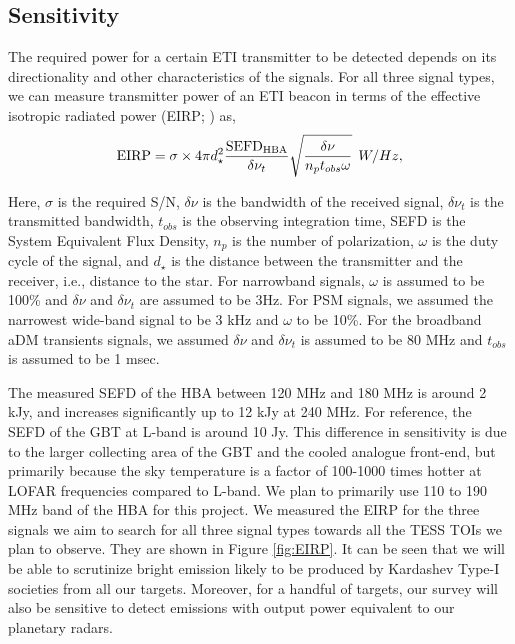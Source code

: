 \documentclass{aastex63}
\begin{document}
\subsection{Sensitivity}
\label{sect:sensitivity}
The required power for a certain ETI transmitter to be detected depends on its directionality and other characteristics of the signals. For all three signal types, we can measure transmitter power of an ETI beacon in terms of the effective isotropic radiated power (EIRP; \citealt{Enriquez:2017}) as, 
\begin{equation}
    {\rm EIRP} = \sigma \times {4 \pi d_\star^2} \frac{\rm SEFD_{\rm HBA}}{\delta{\nu}_{t}} \sqrt{\frac{\delta{\nu}}{n_{p}t_{obs}{\omega}}}  \>\> W/Hz,
    \label{Eq:EIRP}
\end{equation}

Here, $\sigma$ is the required S/N, $\delta{\nu}$ is the bandwidth of the received signal, $\delta{\nu}_{t}$ is the transmitted bandwidth, $t_{obs}$ is the observing integration time, SEFD is the System Equivalent Flux Density, $n_p$ is the number of polarization, $\omega$ is the duty cycle of the signal, and $d_\star$ is the distance between the transmitter and the receiver, i.e., distance to the star. For narrowband signals, $\omega$ is assumed to be 100\% and $\delta{\nu}$ and $\delta{\nu}_{t}$ are assumed to be 3Hz. For PSM signals, we assumed the narrowest wide-band signal to be 3 kHz and $\omega$ to be 10\%. For the broadband aDM transients signals, we assumed $\delta{\nu}$ and $\delta{\nu}_{t}$ is assumed to be 80 MHz and $t_{obs}$ is assumed to be 1 msec. 

The measured SEFD of the HBA between 120 MHz and 180 MHz is around 2 kJy, and increases significantly up to 12 kJy at 240 MHz. For reference, the SEFD of the GBT at L-band is around 10 Jy. This difference in sensitivity is due to the larger collecting area of the GBT and the cooled analogue front-end, but primarily because the sky temperature is a factor of 100-1000 times hotter at LOFAR frequencies compared to L-band. We plan to primarily use 110 to 190 MHz band of the HBA for this project. We measured the EIRP for the three signals we aim to search for all three signal types towards all the TESS TOIs we plan to observe. They are shown in Figure \ref{fig:EIRP}. It can be seen that we will be able to scrutinize bright emission likely to be produced by Kardashev Type-I societies from all our targets. Moreover, for a handful of targets, our survey will also be sensitive to detect emissions with output power equivalent to our planetary radars. 
\end{document}
